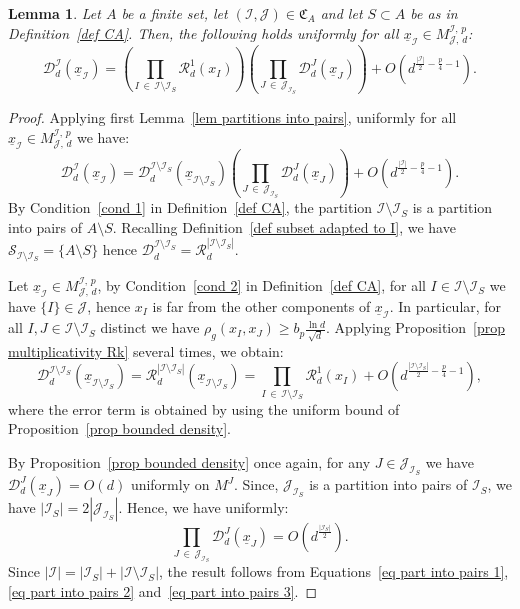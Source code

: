 \documentclass[10pt]{amsart}
\newtheorem{lemm}[theo]{Lemma}\newtheorem{prop}[theo]{Proposition}\newtheorem{coro}[theo]{Corollary}\newtheorem{conj}[theo]{Conjecture}
\theoremstyle{definition}\newtheorem{defi}[theo]{Definition}\newtheorem{rema}[theo]{Remark}\newtheorem{exam}[theo]{Example}\newtheorem{exem}[theo]{Example}\newtheorem{nota}[theo]{Notation}
\newcommand{\D}{\mathcal{D}}
\newcommand{\I}{\mathcal{I}}
\newcommand{\J}{\mathcal{J}}
\newcommand{\clR}{\mathcal{R}}
\newcommand{\clS}{\mathcal{S}}
\newcommand{\frkC}{\mathfrak{C}}
\newcommand{\norm}[1]{\left\lvert #1 \right\rvert}
\renewcommand{\geq}{\geqslant}
\begin{document}
\begin{lemm}\label{lem partitions into pairs 2}
Let $A$ be a finite set, let $(\I,\J) \in \frkC_A$ and let $S \subset A$ be as in Definition~\ref{def CA}. Then, the following holds uniformly for all $\underline{x}_\I \in M^{\I,\,p}_{\J,\,d}$:
\[
\D_d^\I\left(\underline{x}_\I\right) = \left(\prod_{I\,\in\,\I \setminus \I_S} \clR_d^1\left(x_I\right)\right) \left(\prod_{J\, \in\,\J_{\I_S}}\D_d^J\left(\underline{x}_J\right)\right) +O\left(d^{\frac{\norm{\I}}{2}-\frac{p}{4}-1}\right).
\]
\end{lemm}

\begin{proof}
Applying first Lemma~\ref{lem partitions into pairs}, uniformly for all $\underline{x}_\I \in M^{\I,\,p}_{\J,\,d}$ we have:
\begin{equation}\label{eq part into pairs 1}
\D_d^\I\left(\underline{x}_\I\right) = \D_d^{\I \setminus \I_S}\left(\underline{x}_{\I \setminus \I_S}\right) \left(\prod_{J\, \in\,\J_{\I_S}}\D_d^J\left(\underline{x}_J\right)\right) +O\left(d^{\frac{\norm{\I}}{2}-\frac{p}{4}-1}\right).
\end{equation}
By Condition~\eqref{cond 1} in Definition~\ref{def CA}, the partition $\I \setminus \I_S$ is a partition into pairs of $A \setminus S$. Recalling Definition~\ref{def subset adapted to I}, we have $\clS_{\I \setminus \I_S} = \{A \setminus S\}$ hence $\D_d^{\I \setminus \I_S} = \clR_d^{|\I \setminus \I_S|}$.

Let $\underline{x}_\I \in M^{\I,\,p}_{\J,\,d}$, by Condition~\eqref{cond 2} in Definition~\ref{def CA}, for all $I \in \I \setminus \I_S$ we have $\{I\} \in \J$, hence $x_I$ is far from the other components of $\underline{x}_\I$. In particular, for all $I,J \in \I \setminus \I_S$ distinct we have $\rho_g(x_I,x_J) \geq b_p \tfrac{\ln d}{\sqrt{d}}$. Applying Proposition~\ref{prop multiplicativity Rk} several times, we obtain:
\begin{equation}\label{eq part into pairs 2}
\D_d^{\I \setminus \I_S}\left(\underline{x}_{\I \setminus \I_S}\right) = \clR_d^{\norm{\I \setminus \I_S}}\left(\underline{x}_{\I \setminus \I_S}\right) = \prod_{I\,\in\,\I \setminus \I_S} \clR_d^1(x_I) + O\left(d^{\frac{\norm{\I \setminus \I_S}}{2}-\frac{p}{4}-1}\right),
\end{equation}
where the error term is obtained by using the uniform bound of Proposition~\ref{prop bounded density}.

By Proposition~\ref{prop bounded density} once again, for any $J \in \J_{\I_S}$ we have $\D_d^J(\underline{x}_J) = O(d)$ uniformly on $M^J$. Since, $\J_{\I_S}$ is a partition into pairs of $\I_S$, we have $|\I_S| = 2|\J_{\I_S}|$. Hence, we have uniformly:
\begin{equation}\label{eq part into pairs 3}
\prod_{J\,\in\,\J_{\I_S}}\D_d^J\left(\underline{x}_J\right) = O\left(d^\frac{\norm{\I_S}}{2}\right).
\end{equation}
Since $|\I| = |\I_S| + |\I \setminus \I_S|$, the result follows from Equations~\eqref{eq part into pairs 1}, \eqref{eq part into pairs 2} and~\eqref{eq part into pairs 3}.
\end{proof}
\end{document}
